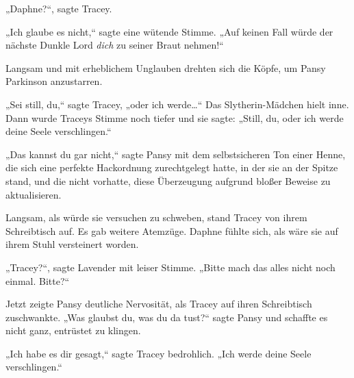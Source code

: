 „Daphne?“, sagte Tracey.

„Ich glaube es nicht,“ sagte eine wütende Stimme. „Auf keinen Fall würde der nächste Dunkle Lord \emph{dich} zu seiner Braut nehmen!“

Langsam und mit erheblichem Unglauben drehten sich die Köpfe, um Pansy Parkinson anzustarren.

„Sei still, du,“ sagte Tracey, „oder ich werde…“ Das Slytherin-Mädchen hielt inne. Dann wurde Traceys Stimme noch tiefer und sie sagte: „Still, du, oder ich werde deine Seele verschlingen.“

„Das kannst du gar nicht,“ sagte Pansy mit dem selbstsicheren Ton einer Henne, die sich eine perfekte Hackordnung zurechtgelegt hatte, in der sie an der Spitze stand, und die nicht vorhatte, diese Überzeugung aufgrund bloßer Beweise zu aktualisieren.

Langsam, als würde sie versuchen zu schweben, stand Tracey von ihrem Schreibtisch auf. Es gab weitere Atemzüge. Daphne fühlte sich, als wäre sie auf ihrem Stuhl versteinert worden.

„Tracey?“, sagte Lavender mit leiser Stimme. „Bitte mach das alles nicht noch einmal. Bitte?“

Jetzt zeigte Pansy deutliche Nervosität, als Tracey auf ihren Schreibtisch zuschwankte. „Was glaubst du, was du da tust?“ sagte Pansy und schaffte es nicht ganz, entrüstet zu klingen.

„Ich habe es dir gesagt,“ sagte Tracey bedrohlich. „Ich werde deine Seele verschlingen.“

